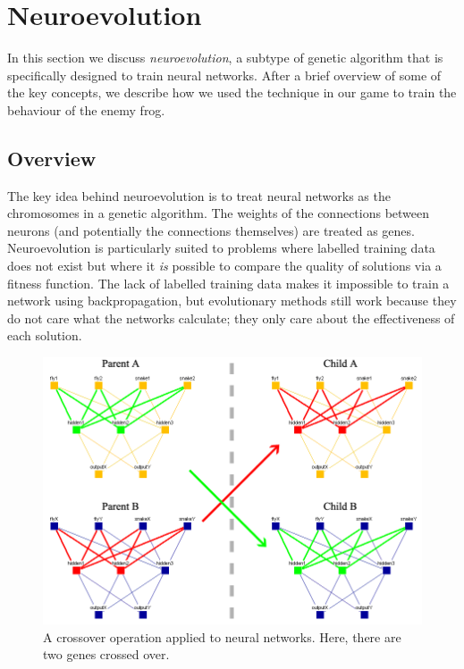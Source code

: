 \clearpage
\section{Neuroevolution} \label{sec:neuro}

In this section we discuss \textit{neuroevolution}, a subtype of genetic algorithm that is specifically designed to train neural networks. After a brief overview of some of the key concepts, we describe how we used the technique in our game to train the behaviour of the enemy frog.

\subsection{Overview}

The key idea behind neuroevolution is to treat neural networks as the chromosomes in a genetic algorithm. The weights of the connections between neurons (and potentially the connections themselves) are treated as genes. Neuroevolution is particularly suited to problems where labelled training data does not exist but where it \textit{is} possible to compare the quality of solutions via a fitness function. The lack of labelled training data makes it impossible to train a network using backpropagation, but evolutionary methods still work because they do not care what the networks calculate; they only care about the effectiveness of each solution.

\begin{figure}[!htbp]
    \centering
    \includegraphics[scale=0.6]{Figs/Crossover.png}
    \caption{A crossover operation applied to neural networks. Here, there are two genes crossed over.}
    \label{fig:netCrossover}
\end{figure}

